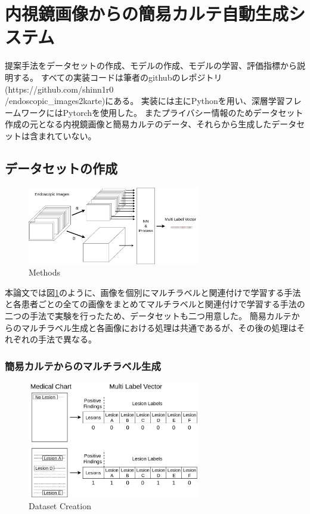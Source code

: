 \section{内視鏡画像からの簡易カルテ自動生成システム}

提案手法をデータセットの作成、モデルの作成、モデルの学習、評価指標から説明する。
すべての実装コードは筆者のgithubのレポジトリ (https://github.com/shinn1r0\\/endoscopic\_images2karte)にある。
実装には主にPythonを用い、深層学習フレームワークにはPytorchを使用した。
またプライバシー情報のためデータセット作成の元となる内視鏡画像と簡易カルテのデータ、それらから生成したデータセットは含まれていない。
\subsection{データセットの作成}
\begin{figure}[tb]
    \begin{center}
        \includegraphics[width=75mm]{./fig/ieice4.png}
        \caption{Methods}
        \label{fig:methods}
    \end{center}
\end{figure}
本論文では図\ref{fig:methods}のように、画像を個別にマルチラベルと関連付けで学習する手法と各患者ごとの全ての画像をまとめてマルチラベルと関連付けで学習する手法の二つの手法で実験を行ったため、データセットも二つ用意した。
簡易カルテからのマルチラベル生成と各画像における処理は共通であるが、その後の処理はそれぞれの手法で異なる。
\subsubsection{簡易カルテからのマルチラベル生成}

\begin{figure}[tb]
    \begin{center}
        \includegraphics[width=75mm]{./fig/ieice1.png}
        \caption{Dataset Creation}
        \label{fig:multilabel}
    \end{center}
\end{figure}

